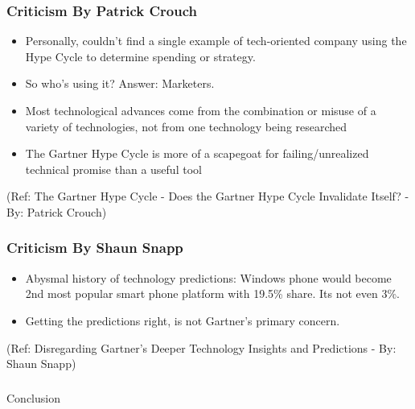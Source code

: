 \begin{frame}[fragile]\frametitle{Criticism By Patrick Crouch}


\begin{itemize}
\item Personally, couldn’t find a single example of tech-oriented company using the Hype Cycle to determine spending or strategy.
\item So who’s using it? Answer: Marketers.
\item Most technological advances come from the combination or misuse of a variety of technologies, not from one technology being researched
\item The Gartner Hype Cycle is more of a scapegoat for failing/unrealized technical promise than a useful tool

\end{itemize}

{\tiny (Ref: The Gartner Hype Cycle - Does the Gartner Hype Cycle Invalidate Itself? - By: Patrick Crouch)}

\end{frame}

\begin{frame}[fragile]\frametitle{Criticism By Shaun Snapp}


\begin{itemize}
\item Abysmal history of technology predictions: Windows phone would become 2nd most popular smart phone platform with 19.5\% share. Its not even 3\%.
\item Getting the predictions right, is not Gartner's primary concern.

\end{itemize}

{\tiny (Ref: Disregarding Gartner's Deeper Technology Insights and Predictions - By: Shaun Snapp)}

\end{frame}


\begin{frame}[fragile]\frametitle{}
\begin{center}
{\Large Conclusion}
\end{center}
\end{frame}


